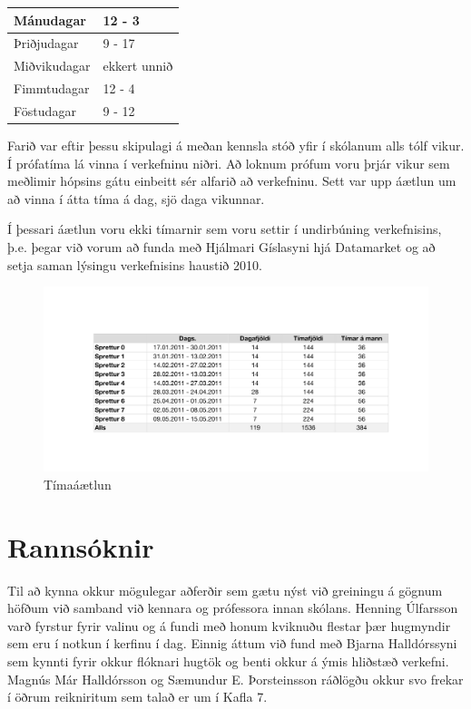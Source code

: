 \documentclass{article}
\begin{document}
\vspace{5 mm}
\begin{tabular}{| l | l |}
\hline
  Mánudagar & 12 - 3 \\
  \hline
  Þriðjudagar & 9 - 17 \\
  \hline
  Miðvikudagar & ekkert unnið\\
  \hline
  Fimmtudagar & 12 - 4 \\
  \hline
  Föstudagar & 9 - 12\\
\hline
\end{tabular}
\vspace{5 mm}

Farið var eftir þessu skipulagi á meðan kennsla stóð yfir í skólanum alls tólf
vikur. 
Í prófatíma lá vinna í verkefninu niðri. 
Að loknum prófum voru þrjár vikur sem meðlimir hópsins gátu einbeitt sér alfarið
að verkefninu. Sett var upp áætlun um að vinna í átta tíma á dag, sjö daga
vikunnar.  

Í þessari áætlun voru ekki tímarnir sem voru settir í undirbúning verkefnisins, þ.e.
þegar við vorum að funda með Hjálmari Gíslasyni hjá Datamarket og að setja saman
lýsingu verkefnisins haustið 2010.

\begin{figure}[H]
  \centering
  \includegraphics[width=1\textwidth]{sprettir_timar.pdf} 
  \caption{Tímaáætlun} 
\end{figure}

\newpage


\section{Rannsóknir}
\label{sec:research}
Til að kynna okkur mögulegar aðferðir sem gætu nýst við greiningu á gögnum
höfðum við samband við kennara og prófessora innan skólans. Henning Úlfarsson
varð fyrstur fyrir valinu og á fundi með honum kviknuðu flestar þær hugmyndir sem eru
í notkun í kerfinu í dag. Einnig áttum við fund með Bjarna Halldórssyni sem
kynnti fyrir okkur flóknari hugtök og benti okkur á ýmis hliðstæð verkefni.
Magnús Már Halldórsson og Sæmundur E. Þorsteinsson ráðlögðu okkur svo frekar í
öðrum reikniritum sem talað er um í Kafla 7.
\end{document}
